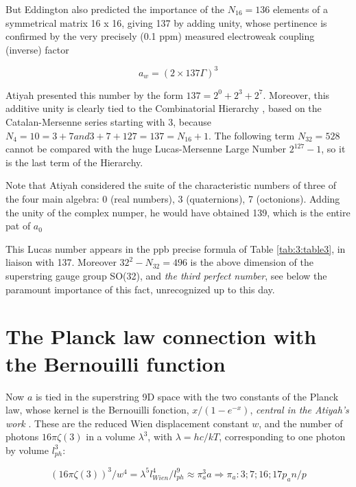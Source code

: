 \documentclass[a4paper,9pt]{article}
\begin{document}
But Eddington also predicted the importance of the $N_{16} = 136$ elements of a symmetrical matrix 16 x 16, giving 137 by adding unity, whose pertinence is confirmed by the very precisely (0.1 ppm) measured electroweak coupling (inverse) factor 

\begin{equation}
a_w = (2\times137 \Gamma)^3
\end{equation}
 
Atiyah presented this number by the form $137 = 2^0 + 2^3 + 2^7$. Moreover, this additive unity is clearly tied to the Combinatorial Hierarchy \cite{Bastin}, based on the Catalan-Mersenne series starting with 3, because $N_4 = 10 = 3 + 7 and 3+7 + 127 = 137 = N_{16} + 1$. The following term $N_{32}  = 528$ cannot be compared with the huge Lucas-Mersenne Large Number $2^{127}- 1$, so it is the last term of the Hierarchy.


Note that Atiyah considered the suite of the characteristic numbers of three of the four main algebra: 0 (real numbers), 3 (quaternions), 7 (octonions). Adding the unity of the complex numper, he would have obtained 139, which is the entire pat of $a_0$ 

This Lucas number appears in the ppb precise formula of Table \ref{tab:3:table3}, in liaison with 137. Moreover $32^2 - N_{32} =  496$ is the above dimension of the superstring gauge group SO(32), and \textit {the third perfect number}, see below the paramount importance of this fact, unrecognized up to this day.









\section{The Planck law connection with the Bernouilli function}

Now $a$ is tied in the superstring 9D space with the two constants of the Planck law, whose kernel is the Bernouilli fonction, $x/(1-e^{-x})$, \textit {central in the Atiyah's work} \cite{Atiyah}. These are the reduced Wien displacement constant $w$, and the number of photons $16\pi \zeta(3)$ in a volume $\lambda^3$, with $\lambda = hc/kT $, corresponding to one photon by volume $l_{ph}^3$:

\begin{equation}
(16\pi\zeta(3))^3/w^4 = \lambda^5l_{Wien}^4/l_{ph}^9 \approx \pi_a^3a    \Rightarrow     \pi_a: 3;7;16;17p_an/p
\end{equation}
\end{document}
